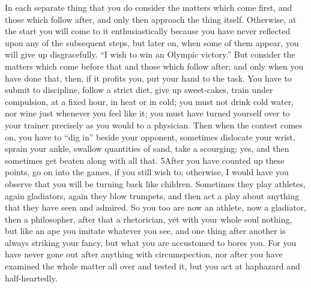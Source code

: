 In each separate thing that you do consider the matters which come first, and those which follow after, and only then approach the thing itself. Otherwise, at the start you will come to it enthusiastically because you have never reflected upon any of the subsequent steps, but later on, when some of them appear, you will give up disgracefully. ``I wish to win an Olympic victory.'' But consider the matters which come before that and those which follow after; and only when you have done that, then, if it profits you, put your hand to the task. You have to submit to discipline, follow a strict diet, give up sweet-cakes, train under compulsion, at a fixed hour, in heat or in cold; you must not drink cold water, nor wine just whenever you feel like it; you must have turned yourself over to your trainer precisely as you would to a physician. Then when the contest comes on, you have to ``dig in'' beside your opponent, sometimes dislocate your wrist, sprain your ankle, swallow quantities of sand, take a scourging; yes, and then sometimes get beaten along with all that. 5After you have counted up these points, go on into the games, if you still wish to; otherwise, I would have you observe that you will be turning back like children. Sometimes they play athletes, again gladiators, again they blow trumpets, and then act a play about anything that they have seen and admired. So you too are now an athlete, now a gladiator, then a philosopher, after that a rhetorician, yet with your whole soul nothing, but like an ape you imitate whatever you see, and one thing after another is always striking your fancy, but what you are accustomed to bores you. For you have never gone out after anything with circumspection, nor after you have examined the whole matter all over and tested it, but you act at haphazard and half-heartedly.

